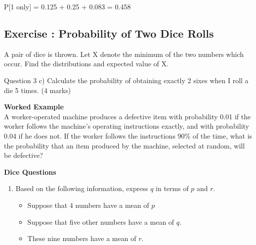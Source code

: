 P[1 only] = 0.125 + 0.25 + 0.083 = 0.458






\subsection{Exercise : Probability of Two Dice Rolls}
A pair of dice is thrown. Let X denote the minimum of the two numbers which occur.
Find the distributions and expected value of X.








Question 3
c) Calculate the probability of obtaining exactly 2 sixes when I roll a die 5 times.
(4 marks)

\noindent \textbf{Worked Example}\\
A worker-operated machine produces a defective item with probability 0.01 if the worker follows the machine’s operating instructions exactly, and with probability 0.04 if he does not. If the worker follows the instructions 90\% of the time, what is the probability that an item produced by the machine, selected at random, will be defective?







\textbf{Dice Questions}
\begin{enumerate}

\item Based on the following information, express $q$ in terms of $p$ and $r$.
\begin{itemize}
\item Suppose that 4 numbers have a mean of $p$
\item Suppose that five other numbers have a mean of $q$.
\item These nine numbers have a mean of $r$.
\end{itemize}


\end{enumerate}

